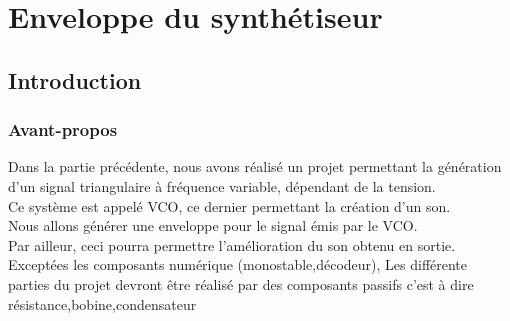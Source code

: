 \part{Enveloppe du synthétiseur}
\chapter{Introduction}

\section{Avant-propos}

Dans la partie précédente, nous avons réalisé un projet permettant la génération d’un signal triangulaire à fréquence variable, dépendant de la tension. \\

Ce système est appelé VCO, ce dernier permettant la création d’un son. \\

Nous allons générer une enveloppe pour le signal émis par le VCO.\\ 
Par ailleur, ceci pourra permettre l'amélioration du son obtenu en sortie. \\
Exceptées les composants numérique (monostable,décodeur), Les différente parties du projet devront être réalisé par des composants passifs c’est à dire 
résistance,bobine,condensateur





